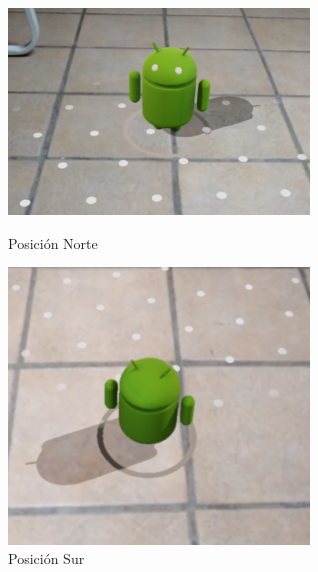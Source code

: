 \begin{figure}[!htbp]
	\begin{minipage}{0.48\textwidth}
	\centering
		\includegraphics[width=8cm]{desarrollo/secciones/pruebas/motog6/img/NORTE.png}
		\caption{Posición Norte}
		\label{fig:motog6norte}
	\end{minipage}\hfill
	\begin{minipage}{0.48\textwidth}
	\centering
	\includegraphics[width=8cm]{desarrollo/secciones/pruebas/motog6/img/SUR.png}
	\caption{Posición Sur}
	\label{fig:motog6sur}
	\end{minipage}\hfill
\end{figure}

